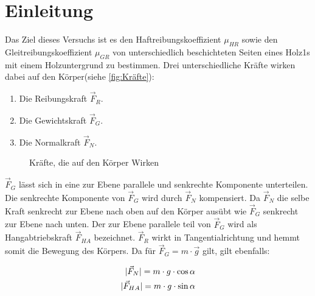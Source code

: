 \section{Einleitung}

Das Ziel dieses Versuchs ist es den Haftreibungskoeffizient $\mu_{HR}$ sowie den Gleitreibungskoeffizient $\mu_{GR}$ von unterschiedlich beschichteten Seiten eines Holz1s mit einem Holzuntergrund zu bestimmen.
\newline
Drei unterschiedliche Kräfte wirken dabei auf den Körper(siehe \autoref{fig:Kräfte}):
\begin{enumerate}
    \item Die Reibungskraft $\vec{F}_R$.
    \item Die Gewichtskraft $\vec{F}_G$.
    \item Die Normalkraft $\vec{F}_N$.
\end{enumerate}


\usetikzlibrary{angles,quotes}
\begin{figure}
    \centering 
    
    \caption[Kräfte am Körper]{Kräfte, die auf den Körper Wirken \cite{schiefeEbene:Fromme}}
    \label{fig:Kräfte}
\end{figure}

$\vec{F}_G$ lässt sich in eine zur Ebene parallele und senkrechte Komponente unterteilen. Die senkrechte Komponente von $\vec{F}_G$ wird durch $\vec{F}_N$ kompensiert. Da $\vec{F}_N$ die selbe Kraft senkrecht zur Ebene nach oben auf den Körper ausübt wie $\vec{F}_G$ senkrecht zur Ebene nach unten. Der zur Ebene parallele teil von $\vec{F}_G$ wird als Hangabtriebskraft $\vec{F}_{HA}$ bezeichnet. $\vec{F}_R$ wirkt in Tangentialrichtung und hemmt somit die Bewegung des Körpers.\newline
Da für $\vec{F}_{G} = m \cdot \vec{g}$ gilt, gilt ebenfalls:

\begin{align}
    \lvert\vec{F}_{N}\rvert = m \cdot g \cdot \cos{\alpha} \label{eq:F_N} \\
    \lvert\vec{F}_{HA}\rvert = m \cdot g \cdot \sin{\alpha} \label{eq:F_HA}
\end{align}

